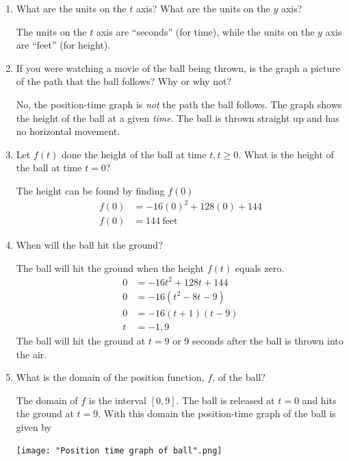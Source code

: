\documentclass[nooutcomes]{ximera}
\begin{document}
\begin{problem}
\begin{enumerate}
		 \item  What are the units on the $t$ axis?  What are the units on the $y$ axis?
		 \begin{freeResponse}		 
	The units on the $t$ axis are ``seconds'' (for time), while the units on the $y$ axis are ``feet'' (for height).        
		\end{freeResponse}
			
		\item  If you were watching a movie of the ball being thrown, is the graph a picture of the path that the ball follows?  Why or why not?
		\begin{freeResponse}		 
	 No, the position-time graph is \emph{not} the path the ball follows.
        The graph shows the height of the ball at a given \emph{time}.
        The ball is thrown straight up and has no horizontal movement.
		\end{freeResponse}
	
		\item Let $f(t)$ done the height of the ball at time $t, t\geq 0$.  What is the height of the ball at time $t=0$?
		\begin{freeResponse}
		The height can be found by finding $f(0)$
		\begin{align*}
			f(0)&=-16(0)^2+128(0)+144 \\
			f(0)&=144\  \text{feet}
 			\end{align*}

		\end{freeResponse}
		
		\item  When will the ball hit the ground?
		\begin{freeResponse}		 
		The ball will hit the ground when the height $f(t)$ equals zero.
			\begin{align*}
			0&=-16t^2+128t+144 \\
			0&=-16(t^2-8t-9) \\
 			0&=-16(t+1)(t-9) \\
 			t&=-1,9 
 			\end{align*}
		The ball will hit the ground at $t=9$ or 9 seconds after the ball is thrown into the air.  
		\end{freeResponse}

		\item  What is the domain of the position function, $f$, of the ball?

		 \begin{freeResponse}
     	   The domain of $f$ is the interval $[0, 9]$.  The ball is released at $t=0$ and hits the ground at $t=9$.
     	   With this domain the position-time graph of the ball is given by
       		 \begin{center}
       	  	 \texttt{[image: "Position time graph of ball".png]}
        		\end{center}
     	 \end{freeResponse}


\end{enumerate}
\end{problem}
\end{document}
